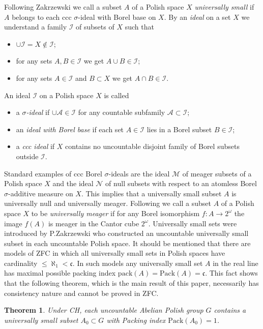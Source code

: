 \documentclass[11pt]{amsart}
\newtheorem{theorem}{Theorem}
\begin{document}
Following Zakrzewski \cite{Zak2} we call a subset $A$ of a Polish space $X$ {\em universally small} if $A$ belongs to each ccc $\sigma$-ideal with Borel base on $X$. By an {\em ideal} on a set $X$ we understand a family $\mathcal I$ of subsets of $X$ such that
\begin{itemize}
\item $\cup{\mathcal I}=X\notin{\mathcal I}$;
\item for any sets $A,B\in{\mathcal I}$ we get $A\cup B\in{\mathcal I}$;
\item for any sets $A\in{\mathcal I}$ and $B\subset X$ we get $A\cap B\in{\mathcal I}$.
\end{itemize}
An ideal ${\mathcal I}$ on a Polish space $X$ is called
\begin{itemize}
\item a {\em $\sigma$-ideal} if $\cup{\mathcal A}\in{\mathcal I}$ for any countable subfamily ${\mathcal A}\subset{\mathcal I}$;
\item an {\em ideal with Borel base} if each set $A\in{\mathcal I}$ lies in a Borel subset $B\in{\mathcal I}$;
\item a {\em ccc ideal} if $X$ contains no uncountable disjoint family of Borel subsets outside ${\mathcal I}$.
\end{itemize}
Standard examples of ccc Borel $\sigma$-ideals are the ideal $\mathcal M$ of meager subsets of a Polish space $X$ and the ideal $\mathcal N$ of null  subsets with respect to an atomless Borel $\sigma$-additive measure on $X$. This implies that a universally small subset $A$ is universally null and universally meager. Following \cite{Zak1} we call a subset $A$ of a Polish space $X$ to be {\em universally meager} if for any Borel isomorphism $f:A\to 2^{\omega}$ the image $f(A)$ is meager in the Cantor cube $2^{\omega}$. Universally small sets were introduced by P.Zakrzewski \cite{Zak2} who constructed an uncountable universally small subset in each uncountable Polish space. It should be mentioned that there are models of ZFC \cite[\S5]{Miller} in which all universally small sets in Polish spaces have cardinality $\le\aleph_1<\mathfrak c$. In such models any universally small set $A$ in the real line has maximal possible packing index ${\mathrm{pack}}(A)={\mathrm{Pack}}(A)=\mathfrak c$. This fact shows that the following theorem, which is the main result of this paper, necessarily has consistency nature and cannot be proved in ZFC.

\begin{theorem}\label{main} Under CH, each uncountable Abelian Polish group $G$ contains a universally small subset $A_0\subset G$ with Packing index ${\mathrm{Pack}}(A_0)=1$.
\end{theorem}
\end{document}
